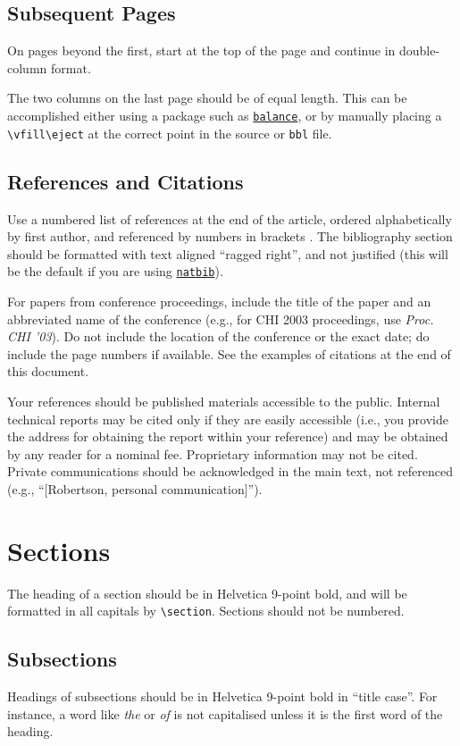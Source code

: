 \documentclass[preprint]{../latex/sigchi-modern}
\begin{document}
\subsection{Subsequent Pages}
On pages beyond the first, start at the top of the page and continue in
double-column format.

The two columns on the last page should be of equal length. This can be 
accomplished either using a package such as 
\texttt{\href{http://ctan.org/pkg/balance}{balance}}, or by manually placing
a \texttt{\textbackslash vfill\textbackslash eject} at the correct point in
the source or \texttt{bbl} file.

\subsection{References and Citations}
Use a numbered list of references at the end of the article, ordered
alphabetically by first author, and referenced by numbers in brackets
\cite{Card1983,Card1990,Card1991,Gillick1996}.
The bibliography section should be formatted with text aligned ``ragged right'',
and not justified (this will be the default if you are using
\texttt{\href{http://ctan.org/pkg/natbib}{natbib}}).

For papers from conference proceedings, include the title of the paper and an
abbreviated name of the conference (e.g., for CHI 2003 proceedings, use
\textit{Proc. CHI '03}). Do not include the location of the conference or the
exact date; do include the page numbers if available. See the examples of
citations at the end of this document.

Your references should be published materials accessible to the public. Internal
technical reports may be cited only if they are easily accessible (i.e., you
provide the address for obtaining the report within your reference) and may be
obtained by any reader for a nominal fee. Proprietary information may not be
cited. Private communications should be acknowledged in the main text, not
referenced (e.g., ``[Robertson, personal communication]'').

\section{Sections}
The heading of a section should be in Helvetica 9-point bold, and will be
formatted in all capitals by \texttt{\textbackslash section}. Sections should
not be numbered.

\subsection{Subsections}
Headings of subsections should be in Helvetica 9-point bold in ``title case''.
For instance, a word like \emph{the} or \emph{of} is not capitalised unless it
is the first word of the heading.
\end{document}
